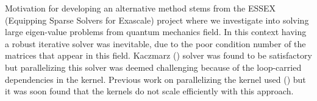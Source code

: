 Motivation for developing an alternative method stems from the ESSEX (Equipping Sparse Solvers for Exascale) project \cite{ESSEX}
 where we investigate into solving large eigen-value problems from quantum mechanics field. In this context having a robust iterative solver was inevitable, due to the poor condition number of the matrices that appear in this field. Kaczmarz (\KACZ) solver was found to be satisfactory but parallelizing this solver was deemed challenging because of the loop-carried dependencies in the kernel. Previous work on parallelizing the \KACZ kernel used \MCfull (\MC) \cite{feast_mc} but it was soon found that the kernels do not scale efficiently with this approach.

